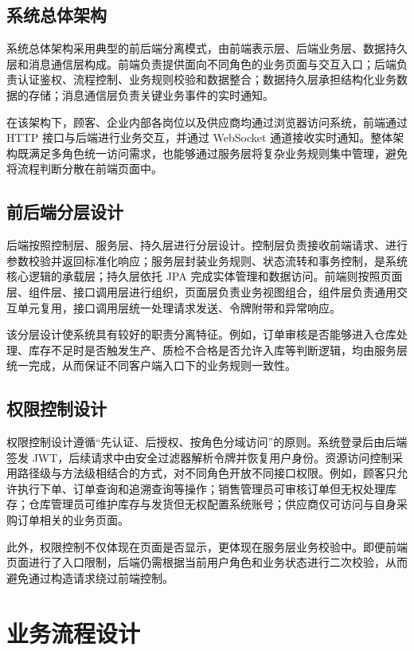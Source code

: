 \subsection{系统总体架构}

系统总体架构采用典型的前后端分离模式，由前端表示层、后端业务层、数据持久层和消息通信层构成。前端负责提供面向不同角色的业务页面与交互入口；后端负责认证鉴权、流程控制、业务规则校验和数据整合；数据持久层承担结构化业务数据的存储；消息通信层负责关键业务事件的实时通知。

在该架构下，顾客、企业内部各岗位以及供应商均通过浏览器访问系统，前端通过 HTTP 接口与后端进行业务交互，并通过 WebSocket 通道接收实时通知。整体架构既满足多角色统一访问需求，也能够通过服务层将复杂业务规则集中管理，避免将流程判断分散在前端页面中。

\subsection{前后端分层设计}

后端按照控制层、服务层、持久层进行分层设计。控制层负责接收前端请求、进行参数校验并返回标准化响应；服务层封装业务规则、状态流转和事务控制，是系统核心逻辑的承载层；持久层依托 JPA 完成实体管理和数据访问。前端则按照页面层、组件层、接口调用层进行组织，页面层负责业务视图组合，组件层负责通用交互单元复用，接口调用层统一处理请求发送、令牌附带和异常响应。

该分层设计使系统具有较好的职责分离特征。例如，订单审核是否能够进入仓库处理、库存不足时是否触发生产、质检不合格是否允许入库等判断逻辑，均由服务层统一完成，从而保证不同客户端入口下的业务规则一致性。

\subsection{权限控制设计}

权限控制设计遵循“先认证、后授权、按角色分域访问”的原则。系统登录后由后端签发 JWT，后续请求中由安全过滤器解析令牌并恢复用户身份。资源访问控制采用路径级与方法级相结合的方式，对不同角色开放不同接口权限。例如，顾客只允许执行下单、订单查询和追溯查询等操作；销售管理员可审核订单但无权处理库存；仓库管理员可维护库存与发货但无权配置系统账号；供应商仅可访问与自身采购订单相关的业务页面。

此外，权限控制不仅体现在页面是否显示，更体现在服务层业务校验中。即便前端页面进行了入口限制，后端仍需根据当前用户角色和业务状态进行二次校验，从而避免通过构造请求绕过前端控制。

\section{业务流程设计}


